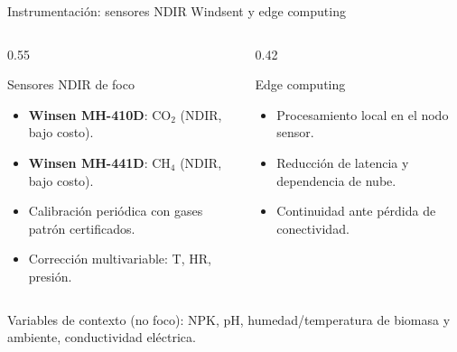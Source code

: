 \documentclass[aspectratio=169, 11pt]{beamer}
\begin{document}
\begin{frame}{Instrumentaci\'{o}n: sensores NDIR Windsent y edge computing}
    \begin{columns}[T]
        \begin{column}{0.55\textwidth}
            \begin{block}{Sensores NDIR de foco}
                \begin{itemize}
                    \item \textbf{Winsen MH-410D}: CO$_2$ (NDIR, bajo costo).
                    \item \textbf{Winsen MH-441D}: CH$_4$ (NDIR, bajo costo).
                    \item Calibraci\'{o}n peri\'{o}dica con gases patr\'{o}n certificados.
                    \item Correcci\'{o}n multivariable: T, HR, presi\'{o}n.
                \end{itemize}
            \end{block}
        \end{column}
        \begin{column}{0.42\textwidth}
            \begin{block}{Edge computing}
                \begin{itemize}
                    \item Procesamiento local en el nodo sensor.
                    \item Reducci\'{o}n de latencia y dependencia de nube.
                    \item Continuidad ante p\'{e}rdida de conectividad.
                \end{itemize}
            \end{block}
        \end{column}
    \end{columns}

    \vfill
    \begin{center}
        \footnotesize
        Variables de contexto (no foco): NPK, pH, humedad/temperatura de biomasa y ambiente, conductividad el\'{e}ctrica.
    \end{center}
\end{frame}
\end{document}
